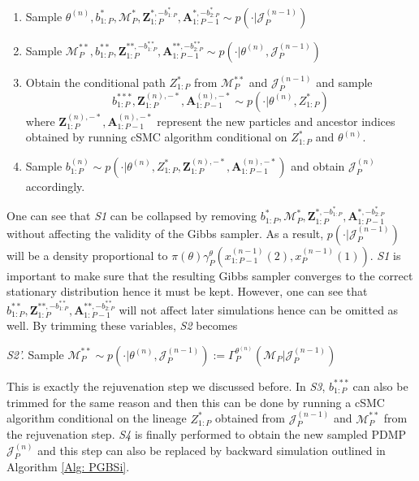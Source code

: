 \documentclass[12pt,a4paper]{article}
\begin{document}
\begin{enumerate}[label=\textit{S\arabic*.},leftmargin=*]
    \item Sample \(\theta^{(n)},b_{1:P}^{*},\mathcal{M}_{P}^{*},\mathbf{Z}_{1:P}^{*,-b_{1:P}^{*}},\mathbf{A}_{1:P-1}^{*,-b_{2:P}^{*}} \sim p(\cdot|\mathcal{J}_P^{(n-1)})\)
    \item Sample \(\mathcal{M}_{P}^{**},b_{1:P}^{**},\mathbf{Z}_{1:P}^{**,-b_{1:P}^{**}},\mathbf{A}_{1:P-1}^{**,-b_{2:P}^{**}} \sim p(\cdot|\theta^{(n)},\mathcal{J}_{P}^{(n-1)})\)
    \item Obtain the conditional path \(Z_{1:P}^{*}\) from \(\mathcal{M}_{P}^{**}\) and \(\mathcal{J}_{P}^{(n-1)}\) and sample \[b_{1:P}^{***},\mathbf{Z}_{1:P}^{(n),-*},\mathbf{A}_{1:P-1}^{(n),-*} \sim p(\cdot|\theta^{(n)},Z_{1:P}^{*})\]
    where \(\mathbf{Z}^{(n),-*}_{1:P},\mathbf{A}^{(n),-*}_{1:P-1}\) represent the new particles and ancestor indices obtained by running cSMC algorithm conditional on \(Z_{1:P}^{*}\) and \(\theta^{(n)}\).
    \item Sample \(b_{1:P}^{(n)} \sim p(\cdot|\theta^{(n)},Z_{1:P}^{*},\mathbf{Z}_{1:P}^{(n),-*},\mathbf{A}_{1:P-1}^{(n),-*})\) and obtain \(\mathcal{J}_{P}^{(n)}\) accordingly. 
\end{enumerate}
One can see that \textit{S1} can be collapsed by removing \(b_{1:P}^{*},\mathcal{M}_{P}^{*},\mathbf{Z}_{1:P}^{*,-b_{1:P}^{*}},\mathbf{A}_{1:P-1}^{*,-b_{2:P}^{*}}\) without affecting the validity of the Gibbs sampler. As a result, \(p(\cdot|\mathcal{J}_P^{(n-1)})\) will be a density proportional to \(\pi(\theta)\gamma_P^{\theta}(x_{1:P-1}^{(n-1)}(2),x_P^{(n-1)}(1))\). \textit{S1} is important to make sure that the resulting Gibbs sampler converges to the correct stationary distribution hence it must be kept. However, one can see that \(b_{1:P}^{**},\mathbf{Z}_{1:P}^{**,-b_{1:P}^{**}},\mathbf{A}_{1:P-1}^{**,-b_{2:P}^{**}}\) will not affect later simulations hence can be omitted as well. By trimming these variables, \textit{S2} becomes

\textit{S2'.} Sample \(\mathcal{M}_P^{**} \sim p(\cdot|\theta^{(n)},\mathcal{J}_P^{(n-1)}):=\Gamma_P^{\theta^{(n)}}(\mathcal{M}_P|\mathcal{J}_{P}^{(n-1)})\)

This is exactly the rejuvenation step we discussed before. In \textit{S3}, \(b_{1:P}^{***}\) can also be trimmed for the same reason and then this can be done by running a cSMC algorithm conditional on the lineage \(Z_{1:P}^{*}\) obtained from \(\mathcal{J}_{P}^{(n-1)}\) and \(\mathcal{M}_P^{**}\) from the rejuvenation step. \textit{S4} is finally performed to obtain the new sampled PDMP \(\mathcal{J}_P^{(n)}\) and this step can also be replaced by backward simulation outlined in Algorithm \ref{Alg: PGBSi}. 
\end{document}
